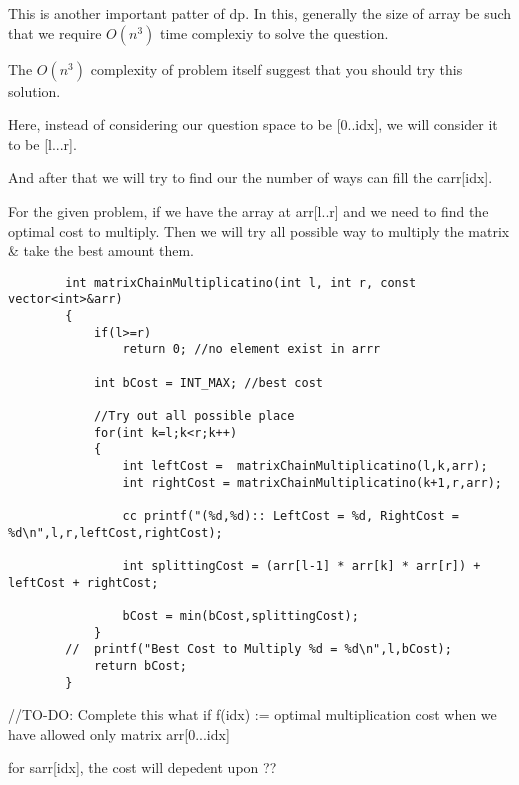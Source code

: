 \begin{solution}
    This is another important patter of dp. 
    In this, generally the size of array be such that we require $O(n^3)$ time complexiy to solve the question.
    
   \begin{marginnote}
    The $O(n^3)$ complexity of problem itself suggest that you should try this solution.
   \end{marginnote}

   \vspace{2mm}
   Here, instead of considering our question space to be [0..idx], we will consider it to be [l...r].


   And after that we will try to find our the number of ways can fill the carr[idx].

   \vspace{2mm}
   For the given problem, if we have the array at arr[l..r] and we need to find the optimal cost to multiply.
   Then we will try all possible way to multiply the matrix \& take the best amount them.
   
   \begin{verbatim}
        int matrixChainMultiplicatino(int l, int r, const vector<int>&arr)
        {
            if(l>=r)
                return 0; //no element exist in arrr

            int bCost = INT_MAX; //best cost
            
            //Try out all possible place
            for(int k=l;k<r;k++)
            {
                int leftCost =  matrixChainMultiplicatino(l,k,arr);
                int rightCost = matrixChainMultiplicatino(k+1,r,arr);

                cc printf("(%d,%d):: LeftCost = %d, RightCost = %d\n",l,r,leftCost,rightCost);

                int splittingCost = (arr[l-1] * arr[k] * arr[r]) + leftCost + rightCost;

                bCost = min(bCost,splittingCost);
            }
        //  printf("Best Cost to Multiply %d = %d\n",l,bCost);
            return bCost;
        }
   \end{verbatim}

\end{solution}

\begin{solution}
    //TO-DO: Complete this
    what if f(idx) := optimal multiplication cost when we have allowed only matrix arr[0...idx]

    for sarr[idx], the cost will depedent upon ??
\end{solution}
    